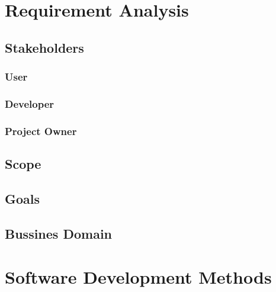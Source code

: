 \documentclass{article}
\begin{document}
\pagebreak

\section{Requirement Analysis}
    
        \subsection{Stakeholders}
        

            \subsubsection{User}
            
            
            \subsubsection{Developer}
            
            
            \subsubsection{Project Owner}
            
    
        \subsection{Scope}
        
    
        \subsection{Goals}
        

        \subsection{Bussines Domain}
        

\pagebreak

\section{Software Development Methods}
\end{document}
